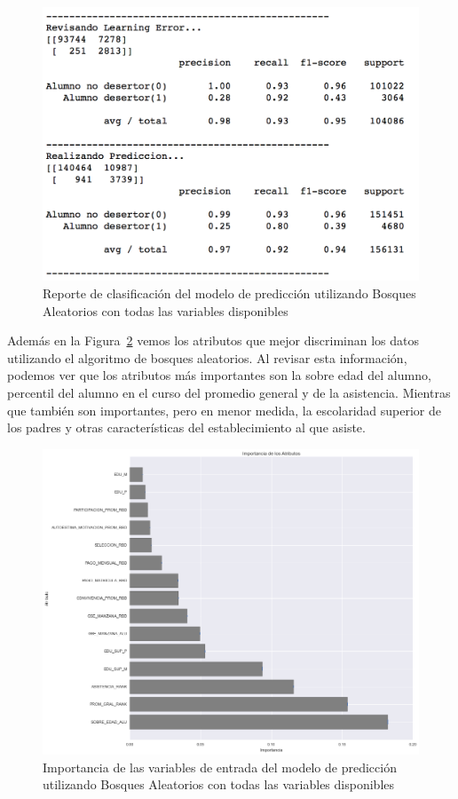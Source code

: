 \begin{figure}[H]
  \centering
    \includegraphics[trim=0cm 0cm 0cm 0cm,scale=0.65]{Figuras/7AnalisisResultado/clas-total.png}
      \caption{Reporte de clasificación del modelo de predicción utilizando Bosques Aleatorios con todas las variables disponibles}
    \label{fig:clas-total}
\end{figure}

Además en la Figura~\ref{fig:impo-total} vemos los atributos que mejor discriminan los datos utilizando el algoritmo de bosques aleatorios. Al revisar esta información, podemos ver que los atributos más importantes son la sobre edad del alumno, percentil del alumno en el curso del promedio general y de la asistencia. Mientras que también son importantes, pero en menor medida, la escolaridad superior de los padres y otras características del establecimiento al que asiste.

\begin{figure}[H]
  \centering
    \includegraphics[trim=0cm 0cm 0cm 0cm,scale=0.4]{Figuras/7AnalisisResultado/impo-total.png}
      \caption{Importancia de las variables de entrada del modelo de predicción utilizando Bosques Aleatorios con todas las variables disponibles}
    \label{fig:impo-total}
\end{figure}

